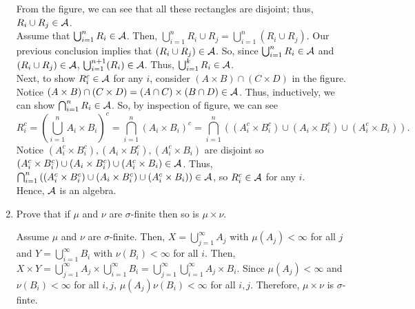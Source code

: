 \begin{enumerate}
\begin{pf}
\[\]
From the figure, we can see that all these rectangles are disjoint; thus, $R_i \cup R_j \in {\mathcal A}$.\\ Assume that $\bigcup_{i=1}^{n}R_i \in {\mathcal A}$. Then,  $\bigcup_{i=1}^{n}R_i \cup R_j= \bigcup_{i=1}^n (R_i \cup R_j)$. Our previous conclusion implies that $(R_i \cup R_j) \in {\mathcal A}$. So, since $\bigcup_{i=1}^{n}R_i \in {\mathcal A}$ and $(R_i \cup R_j) \in {\mathcal A}$, $\bigcup_{i=1}^{n+1} (R_i) \in {\mathcal A}$. Thus, $\bigcup_{i=1}^k R_i  \in {\mathcal A}$. \\
Next, to show $R_i^c \in {\mathcal A}$ for any $i$, consider $(A \times B) \cap (C \times D)$ in the figure. Notice $(A \times B) \cap (C \times D)=(A \cap C) \times (B \cap D) \in {\mathcal A}$. Thus, inductively, we can show $\bigcap_{i=1}^n R_i \in {\mathcal A}$. So, by inspection of figure, we can see
\[
R_i^c=\left(\bigcup_{i=1}^n A_i\times B_i \right)^c=\bigcap_{i=1}^n (A_i\times B_i)^c=\bigcap_{i=1}^n\left( (A_i^c\times B_i^c) \cup (A_i\times B_i^c) \cup (A_i^c\times B_i)\right). 
\]
Notice $(A_i^c\times B_i^c), (A_i\times B_i^c), (A_i^c\times B_i)$ are disjoint so $(A_i^c\times B_i^c) \cup (A_i\times B_i^c) \cup (A_i^c\times B_i) \in {\mathcal A}$. Thus, $\bigcap_{i=1}^n\left( (A_i^c\times B_i^c) \cup (A_i\times B_i^c) \cup (A_i^c\times B_i)\right) \in {\mathcal A}$, so $R_i^c \in {\mathcal A}$ for any $i$.\\
Hence, ${\mathcal A}$ is an algebra. 
\end{pf}

\item Prove that if $\mu$ and $\nu$ are $\sigma$-finite then so is $\mu \times \nu$. 
\begin{pf}
	Assume $\mu$ and $\nu$ are $\sigma$-finite. Then, $X=\bigcup_{j=1}^\infty A_j$ with $\mu(A_j)<\infty$ for all $j$ and $Y=\bigcup_{i=1}^\infty B_i$ with $\nu(B_i)< \infty$ for all $i$. Then, $X \times Y=\bigcup_{j=1}^\infty A_j \times \bigcup_{i=1}^\infty B_i=\bigcup_{j=1}^\infty \bigcup_{i=1}^\infty A_j \times B_i$. Since $\mu(A_j)<\infty$ and $\nu(B_i)< \infty$ for all $i, j$, $\mu(A_j)\nu(B_i)<\infty$ for all $i, j$. Therefore, $\mu \times \nu$ is $\sigma$-finte.
\end{pf}
\end{enumerate}
